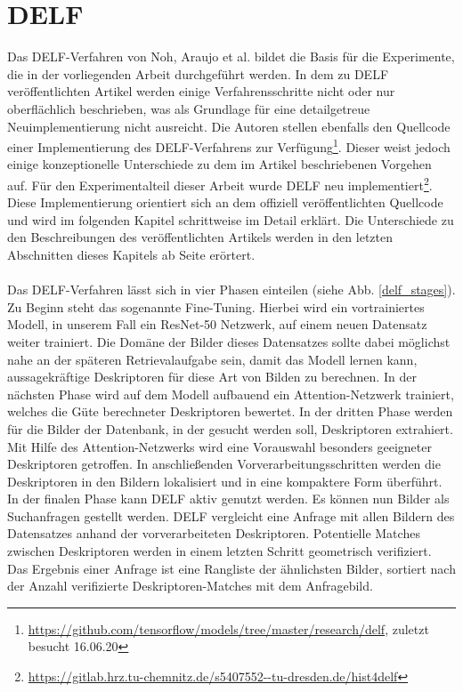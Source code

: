 \chapter{DELF}\label{delf_chapter}
Das DELF-Verfahren \cite{delf} von Noh, \mbox{Araujo} et al. bildet die Basis für die Experimente, die in der vorliegenden Arbeit durchgeführt werden.
In dem zu DELF veröffentlichten Artikel werden einige Verfahrensschritte nicht oder nur oberflächlich beschrieben, was als Grundlage für eine detailgetreue Neuimplementierung nicht ausreicht. Die Autoren stellen ebenfalls den Quellcode einer Implementierung des DELF-Verfahrens zur Verfügung\footnote{\url{https://github.com/tensorflow/models/tree/master/research/delf}, zuletzt besucht 16.06.20}. Dieser weist jedoch einige konzeptionelle Unterschiede zu dem im Artikel beschriebenen Vorgehen auf. Für den Experimentalteil dieser Arbeit wurde DELF neu implementiert\footnote{\url{https://gitlab.hrz.tu-chemnitz.de/s5407552--tu-dresden.de/hist4delf}}. Diese Implementierung orientiert sich an dem offiziell veröffentlichten Quellcode und wird im folgenden Kapitel schrittweise im Detail erklärt. Die Unterschiede zu den Beschreibungen des veröffentlichten Artikels werden in den letzten Abschnitten dieses Kapitels ab Seite \pageref{pipeline_changes} erörtert.  
\\\\
Das DELF-Verfahren lässt sich in vier Phasen einteilen (siehe Abb. \ref{delf_stages}). Zu Beginn steht das sogenannte Fine-Tuning. Hierbei wird ein vortrainiertes Modell, in unserem Fall ein ResNet-50 Netzwerk, auf einem neuen Datensatz weiter trainiert. Die Domäne der Bilder dieses Datensatzes sollte dabei möglichst nahe an der späteren Retrievalaufgabe sein, damit das Modell lernen kann, aussagekräftige Deskriptoren für diese Art von Bilden zu berechnen. In der nächsten Phase wird auf dem Modell aufbauend ein Attention-Netzwerk trainiert, welches die Güte berechneter Deskriptoren bewertet. In der dritten Phase werden für die Bilder der Datenbank, in der gesucht werden soll, Deskriptoren extrahiert. Mit Hilfe des Attention-Netzwerks wird eine Vorauswahl besonders geeigneter Deskriptoren getroffen. In anschließenden Vorverarbeitungsschritten werden die Deskriptoren in den Bildern lokalisiert und in eine kompaktere Form überführt. In der finalen Phase kann DELF aktiv genutzt werden. Es können nun Bilder als Suchanfragen gestellt werden. DELF vergleicht eine Anfrage mit allen Bildern des Datensatzes anhand der vorverarbeiteten Deskriptoren. Potentielle Matches zwischen Deskriptoren werden in einem letzten Schritt geometrisch verifiziert. Das Ergebnis einer Anfrage ist eine Rangliste der ähnlichsten Bilder, sortiert nach der Anzahl verifizierte Deskriptoren-Matches mit dem Anfragebild.

